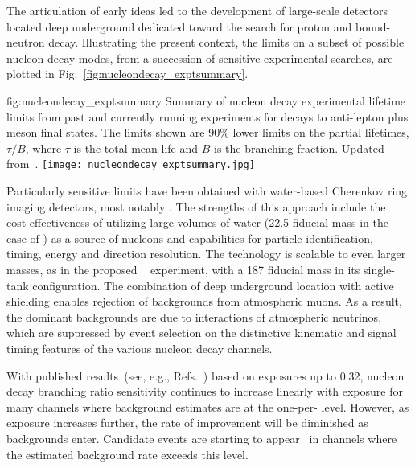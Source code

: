 The articulation of early  ideas led to the development of large-scale 
detectors located deep underground dedicated toward the search for proton and 
bound-neutron decay.  Illustrating the present context, the limits on a subset 
of possible nucleon decay modes, from a succession of sensitive experimental searches, 
are plotted in Fig.~\ref{fig:nucleondecay_exptsummary}.
%
\begin{dunefigure}
{fig:nucleondecay_exptsummary}
{Summary of nucleon decay experimental lifetime limits from past and currently 
running experiments for decays to anti-lepton plus meson final states.  
The limits shown are 90\%  lower limits on the partial lifetimes, 
$\tau/B$, where $\tau$ is the total mean life and $B$ is the branching fraction. 
Updated from~\cite{Babu:2013jba}.}
\texttt{[image: nucleondecay\_exptsummary.jpg]}
\end{dunefigure}
%

Particularly sensitive limits have been obtained with water-based Cherenkov ring 
imaging detectors, most notably \superk.  The strengths of this approach include 
the cost-effectiveness of utilizing large volumes of water (\SI{22.5}{\kt} fiducial 
mass in the case of \superk) as a source of nucleons and 
capabilities for particle identification, timing, energy and direction resolution.
The technology is scalable to even larger masses, as in the proposed 
\hyperk~\cite{Abe:2018uyc} experiment, with a \SI{187}{\kt} fiducial mass in its  
single-tank configuration.  The combination of deep underground location with active 
shielding enables rejection of backgrounds from atmospheric muons.  As a result, the 
dominant backgrounds are due to interactions of atmospheric neutrinos, which are suppressed 
by event selection on the distinctive kinematic and signal timing features of
the various nucleon decay channels. 

With published results~(see, e.g., 
Refs.~\cite{Abe:2014mwa,Miura:2016krn,TheSuper-Kamiokande:2017tit})
based on exposures up to \SI{0.32}{\Mtyr}, \superk 
nucleon decay branching ratio sensitivity continues to increase linearly 
with exposure for many channels where background estimates are at the 
one-per-\si{\Mtyr} level.  However, as exposure increases further, the 
rate of improvement will be diminished as backgrounds enter.    
Candidate events are starting to appear~\cite{TheSuper-Kamiokande:2017tit} 
in channels where the estimated background rate exceeds this level.  

